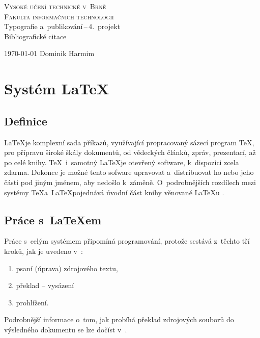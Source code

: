 \documentclass[a4paper, 11pt]{article}
\begin{document}
	\begin{titlepage}
		\begin{center}
			\Huge
			\textsc{Vysoké učení technické v~Brně} \\
			\huge
			\textsc{Fakulta informačních technologií} \\
			\LARGE
			Typografie a~publikování\,--\,4.~projekt \\
			\Huge
			Bibliografické citace
		\end{center}

		{\Large
			\today
			\hfill
			Dominik Harmim
		}
	\end{titlepage}

	\section{Systém \LaTeX}

	\subsection{Definice}
	\LaTeX je komplexní sada příkazů, využívající propracovaný sázecí program \TeX, pro přípravu široké
	škály dokumentů, od vědeckých článků, zpráv, prezentací, až po celé knihy. \TeX\ i~samotný \LaTeX je
	otevřený software, k~dispozici zcela zdarma. Dokonce je možné tento sofware upravovat a~distribuovat
	ho nebo jeho části pod jiným jménem, aby nedošlo k~záměně. O~podrobnějších rozdílech mezi systémy
	\TeX a~\LaTeX pojednává úvodní část knihy věnované {\LaTeX}u \cite{Kopkac2004}.

	\subsection{Práce s~{\LaTeX}em}
	Práce s~celým systémem připomíná programování, protože sestává z~těchto tří kroků, jak je uvedeno
	v~\cite{Rybicka2003}:
	\begin{enumerate}
		\item psaní (úprava) zdrojového textu,
		\item překlad -- vysázení
		\item prohlížení.
	\end{enumerate}
	Podrobnější informace o~tom, jak probíhá překlad zdrojových souborů do výsledného dokumentu se lze
	dočíst v~\cite{Rybicka2003}.
\end{document}
